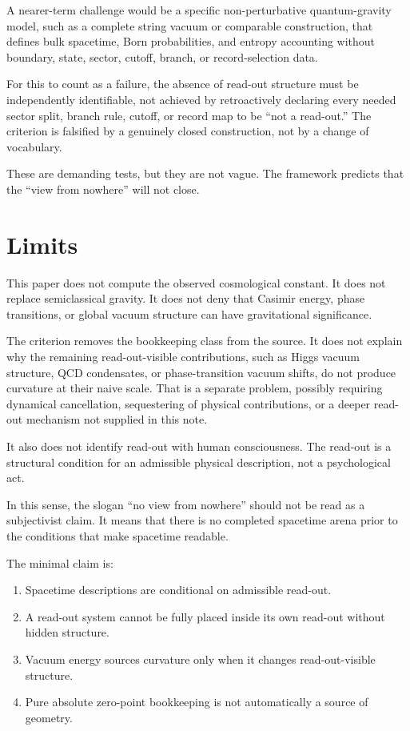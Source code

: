 \documentclass[12pt,a4paper]{article}
\theoremstyle{definition}
\theoremstyle{remark}
\newcommand{\tightlist}{%
  \setlength{\itemsep}{0pt}\setlength{\parskip}{0pt}}
\begin{document}
A nearer-term challenge would be a specific non-perturbative quantum-gravity model, such as a complete string vacuum or comparable construction, that defines bulk spacetime, Born probabilities, and entropy accounting without boundary, state, sector, cutoff, branch, or record-selection data.

For this to count as a failure, the absence of read-out structure must be independently identifiable, not achieved by retroactively declaring every needed sector split, branch rule, cutoff, or record map to be ``not a read-out.'' The criterion is falsified by a genuinely closed construction, not by a change of vocabulary.

These are demanding tests, but they are not vague. The framework predicts that the ``view from nowhere'' will not close.

\section{Limits}
\label{sec:limits}

This paper does not compute the observed cosmological constant. It does not replace semiclassical gravity. It does not deny that Casimir energy, phase transitions, or global vacuum structure can have gravitational significance.

The criterion removes the bookkeeping class from the source. It does not explain why the remaining read-out-visible contributions, such as Higgs vacuum structure, QCD condensates, or phase-transition vacuum shifts, do not produce curvature at their naive scale. That is a separate problem, possibly requiring dynamical cancellation, sequestering of physical contributions, or a deeper read-out mechanism not supplied in this note.

It also does not identify read-out with human consciousness. The read-out is a structural condition for an admissible physical description, not a psychological act.

In this sense, the slogan ``no view from nowhere'' should not be read as a subjectivist claim. It means that there is no completed spacetime arena prior to the conditions that make spacetime readable.

The minimal claim is:

\begin{enumerate}[leftmargin=*]
\tightlist
\item Spacetime descriptions are conditional on admissible read-out.
\item A read-out system cannot be fully placed inside its own read-out without hidden structure.
\item Vacuum energy sources curvature only when it changes read-out-visible structure.
\item Pure absolute zero-point bookkeeping is not automatically a source of geometry.
\end{enumerate}
\end{document}
